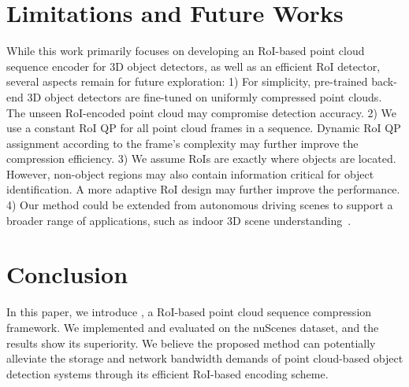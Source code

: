 \section{Limitations and Future Works}
While this work primarily focuses on developing an RoI-based point cloud sequence encoder for 3D object detectors, as well as an efficient RoI detector, several aspects remain for future exploration: 
1) For simplicity, pre-trained back-end 3D object detectors are fine-tuned on uniformly compressed point clouds. The unseen RoI-encoded point cloud may compromise detection accuracy. 
2) We use a constant RoI QP for all point cloud frames in a sequence. Dynamic RoI QP assignment according to the frame's complexity may further improve the compression efficiency. 
3) We assume RoIs are exactly where objects are located. However, non-object regions may also contain information critical for object identification. A more adaptive RoI design may further improve the performance.
4) Our method could be extended from autonomous driving scenes to support a broader range of applications, such as indoor 3D scene understanding~\cite{dai2017scannet, armeni_cvpr16}.

\section{Conclusion}
In this paper, we introduce \methodname{}, a RoI-based point cloud sequence compression framework. We implemented and evaluated \methodname{} on the nuScenes dataset, and the results show its superiority. We believe the proposed method can potentially alleviate the storage and network bandwidth demands of point cloud-based object detection systems through its efficient RoI-based encoding scheme.



